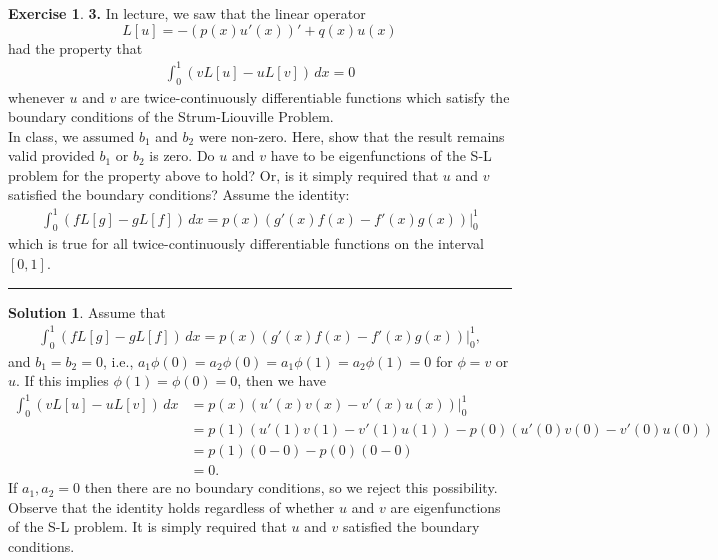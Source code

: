 \documentclass{article}
\theoremstyle{definition}
\newtheorem*{exer*}{Exercise}
\newtheorem*{sln*}{Solution}
\begin{document}
\begin{exer*}\textbf{3. } In lecture, we saw that the linear operator $$L[u] = -(p(x)u'(x))' + q(x)u(x)$$ had the property that
	\begin{align*}
	\int^1_0 (vL[u] - uL[v])\,dx = 0
	\end{align*}
	whenever $u$ and $v$ are twice-continuously differentiable functions which satisfy the boundary conditions of the Strum-Liouville Problem. \\
	
	In class, we assumed $b_1$ and $b_2$ were non-zero. Here, show that the result remains valid
	provided $b_1$ or $b_2$ is zero. Do $u$ and $v$ have to be eigenfunctions of the S-L problem for the property above to hold? Or, is it simply required that $u$ and $v$ satisfied the boundary conditions? Assume the identity:
	\begin{align*}
	\int^1_0 (fL[g] - gL[f])\,dx = p(x)(g'(x)f(x) - f'(x)g(x))\bigg\vert^1_0
	\end{align*}
	which is true for all twice-continuously differentiable functions on the interval $[0,1]$.
	
	\noindent\rule{\textwidth}{0.5pt}
	
	\begin{sln*}
		Assume that
		\begin{align*}
		\int^1_0 (fL[g] - gL[f])\,dx = p(x)(g'(x)f(x) - f'(x)g(x))\bigg\vert^1_0,
		\end{align*}
		and $b_1 = b_2 = 0$, i.e., $a_1 \phi(0) = a_2 \phi(0) = a_1 \phi(1) = a_2\phi(1) = 0$ for $\phi = v$ or $u$. If this implies $\phi(1) = \phi(0) = 0$, then  we have
		\begin{align*}
		\int^1_0 (vL[u] - uL[v])\,dx &= p(x)(u'(x)v(x) - v'(x)u(x))\bigg\vert^1_0\\
		&= p(1)(u'(1)v(1) - v'(1)u(1)) - p(0)(u'(0)v(0) - v'(0)u(0))\\
		&= p(1)(0-0) - p(0)(0-0)\\
		&= 0.
		\end{align*}
		If $a_1, a_2 = 0$ then there are no boundary conditions, so we reject this possibility.\\
		
		Observe that the identity holds regardless of whether $u$ and $v$ are eigenfunctions of the S-L problem. It is simply required that $u$ and $v$ satisfied the boundary conditions. 
	\end{sln*}
\end{exer*}


\newpage
\end{document}
